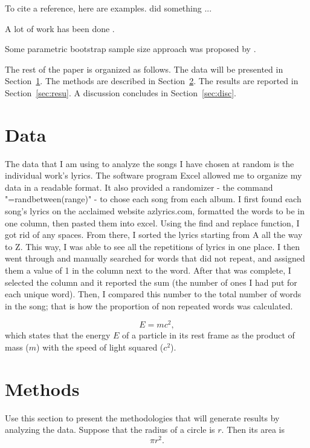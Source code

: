 \documentclass[12pt]{article}
\begin{document}
To cite a reference, here are examples.
\citet{xie2015dynamic} did something ... 

A lot of work has been done \citep[e.g.,][]{xie2015dynamic}.

Some parametric bootstrap sample size approach was proposed by
\citet{dwivedi2017analysis}. 


The rest of the paper is organized as follows.
The data will be presented in Section~\ref{sec:data}.
The methods are described in Section~\ref{sec:meth}.
The results are reported in Section~\ref{sec:resu}.
A discussion concludes in Section~\ref{sec:disc}.


\section{Data}
\label{sec:data}

The data that I am using to analyze the songs I have chosen at random is the individual work's lyrics. The software program Excel allowed me to organize my data in a readable format. It also provided a randomizer - the command "=randbetween(range)" - to chose each song from each album. I first found each song's lyrics on the acclaimed website azlyrics.com, formatted the words to be in one column, then pasted them into excel. Using the find and replace function, I got rid of any spaces. From there, I sorted the lyrics starting from A all the way to Z. This way, I was able to see all the repetitions of lyrics in one place. I then went through and manually searched for words that did not repeat, and assigned them a value of 1 in the column next to the word. After that was complete, I selected the column and it reported the sum (the number of ones I had put for each unique word). Then, I compared this number to the total number of words in the song; that is how the proportion of non repeated words was calculated.

\begin{equation}
  \label{eq:mc2}
  E = m c^2,
\end{equation}
which states that the energy $E$ of a particle in its rest frame as the product
of mass ($m$) with the speed of light squared ($c^2$).


\section{Methods}
\label{sec:meth}

Use this section to present the methodologies that will generate results by
analyzing the data. Suppose that the radius of a circle is $r$. Then its area is
\begin{equation}
  \label{eq:area}
  \pi r^2.
\end{equation}
\end{document}
